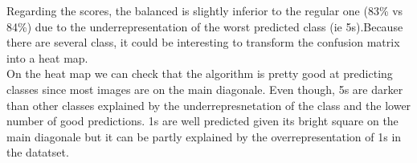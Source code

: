 Regarding the scores, the balanced is slightly inferior to the regular one (83\% vs 84\%) due to the underrepresentation of the worst predicted class (ie 5s).Because there are several class, it could be interesting to transform the confusion matrix into a heat map. \\

On the heat map we can check that the algorithm is pretty good at predicting classes since most images are on the main diagonale. Even though, 5s are darker than other classes explained by the underrepresnetation of the class and the lower number of good predictions. 1s are well predicted given its bright square on the main diagonale but it can be partly explained by the overrepresentation of 1s in the datatset. 


